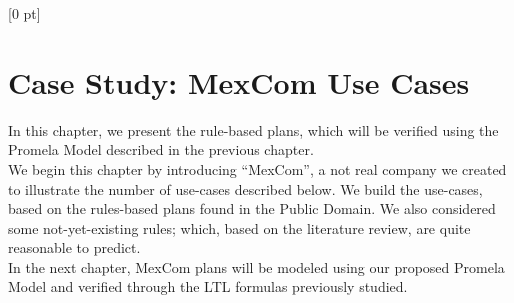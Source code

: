 \titlespacing{\chapter}{0 pt}{30 pt}{50 pt}[0 pt]
\titleformat{\section}{\Large\bfseries}{\thesection}{0 pt}{\hspace{30 pt}}
\titleformat{\subsection}{\large\bfseries}{\thesubsection}{0 pt}{\hspace{30 pt}}
\pagestyle{fancy}
\fancyhead[LO,LE]{\footnotesize\emph{\leftmark}}
\fancyhead[RO,RE]{\thepage}
\fancyfoot[CO,CE]{}
\newcommand{\tabitem}{~~\llap{\textbullet}~~}

\chapter{Case Study: MexCom Use Cases} %

\normalsize
\noindent
In this chapter, we present the rule-based plans, which will be verified using the Promela Model described in the previous chapter. \\

We begin this chapter by introducing ``MexCom'', a not real company we created to illustrate the number of use-cases described below. We build the use-cases, based on the rules-based plans found in the Public Domain. We also considered some not-yet-existing rules; which, based on the literature review, are quite reasonable to predict. \\

In the next chapter, MexCom plans will be modeled using our proposed Promela Model and verified through the LTL formulas previously studied. \\

